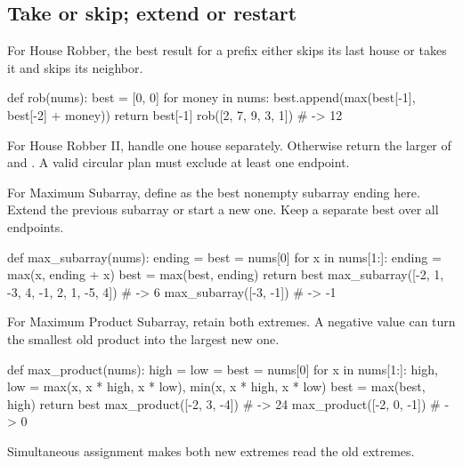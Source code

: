 \documentclass[11pt]{article}
\newcommand{\cd}[1]{{\frenchspacing\texttt{\detokenize{#1}}}}
\begin{document}
\subsection{Take or skip; extend or restart}
For House Robber, the best result for a prefix either skips its last house or takes it and skips its neighbor.
\par\noindent\begin{minipage}{\linewidth}
\hypertarget{example-start-48}{}
\begin{pyex}
def rob(nums):
    best = [0, 0]
    for money in nums:
        best.append(max(best[-1], best[-2] + money))
    return best[-1]
rob([2, 7, 9, 3, 1])                 # -> 12
\end{pyex}
\hypertarget{example-end-48}{}
\end{minipage}\par
For House Robber II, handle one house separately. Otherwise return the larger of \cd{rob(nums[1:])} and \cd{rob(nums[:-1])}.
A valid circular plan must exclude at least one endpoint.

For Maximum Subarray, define \cd{ending} as the best nonempty subarray ending here.
Extend the previous subarray or start a new one. Keep a separate best over all endpoints.
\par\noindent\begin{minipage}{\linewidth}
\hypertarget{example-start-49}{}
\begin{pyex}
def max_subarray(nums):
    ending = best = nums[0]
    for x in nums[1:]:
        ending = max(x, ending + x)
        best = max(best, ending)
    return best
max_subarray([-2, 1, -3, 4, -1, 2, 1, -5, 4]) # -> 6
max_subarray([-3, -1])                # -> -1
\end{pyex}
\hypertarget{example-end-49}{}
\end{minipage}\par
For Maximum Product Subarray, retain both extremes. A negative value can turn the smallest old product into the largest new one.
\par\noindent\begin{minipage}{\linewidth}
\hypertarget{example-start-50}{}
\begin{pyex}
def max_product(nums):
    high = low = best = nums[0]
    for x in nums[1:]:
        high, low = max(x, x * high, x * low), min(x, x * high, x * low)
        best = max(best, high)
    return best
max_product([-2, 3, -4])              # -> 24
max_product([-2, 0, -1])              # -> 0
\end{pyex}
\hypertarget{example-end-50}{}
\end{minipage}\par
Simultaneous assignment makes both new extremes read the old extremes.
\end{document}
